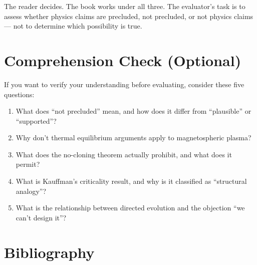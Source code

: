 The reader decides. The book works under all three. The evaluator's task is to assess whether physics claims are precluded, not precluded, or not physics claims --- not to determine which possibility is true.

\section*{Comprehension Check (Optional)}

If you want to verify your understanding before evaluating, consider these five questions:

\begin{enumerate}
\item What does ``not precluded'' mean, and how does it differ from ``plausible'' or ``supported''?
\item Why don't thermal equilibrium arguments apply to magnetospheric plasma?
\item What does the no-cloning theorem actually prohibit, and what does it permit?
\item What is Kauffman's criticality result, and why is it classified as ``structural analogy''?
\item What is the relationship between directed evolution and the objection ``we can't design it''?
\end{enumerate}

\section*{Bibliography}

